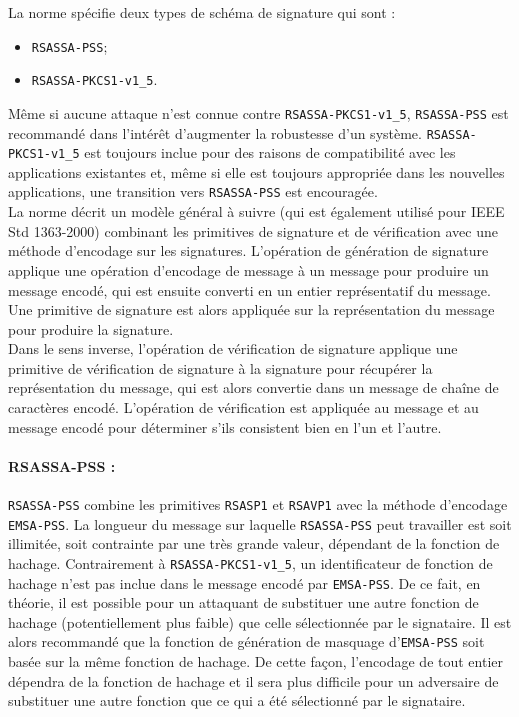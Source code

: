 La norme spécifie deux types de schéma de signature qui sont :
\begin{itemize}
\item \texttt{RSASSA-PSS};
\item \texttt{RSASSA-PKCS1-v1\_5}. \\
\end{itemize}

Même si aucune attaque n'est connue contre \texttt{RSASSA-PKCS1-v1\_5}, \texttt{RSASSA-PSS} est recommandé dans l'intérêt d'augmenter la robustesse d'un système. \texttt{RSASSA-PKCS1-v1\_5} est toujours inclue pour des raisons de compatibilité avec les applications existantes et, même si elle est toujours appropriée dans les nouvelles applications, une transition vers \texttt{RSASSA-PSS} est encouragée.\\ 


La norme décrit un modèle général à suivre (qui est également utilisé pour IEEE Std 1363-2000) combinant les primitives de signature et de vérification avec une méthode d'encodage sur les signatures. L'opération de génération de signature applique une opération d'encodage de message à un message pour produire un message encodé, qui est ensuite converti en un entier représentatif du message. Une primitive de signature est alors appliquée sur la représentation du message pour produire la signature.\\ 


Dans le sens inverse, l'opération de vérification de signature applique une primitive de vérification de signature à la signature pour récupérer la représentation du message, qui est alors convertie dans un message de chaîne de caractères encodé. L'opération de vérification est appliquée au message et au message encodé pour déterminer s'ils  consistent bien en l'un et l'autre.\\ 


\paragraph{RSASSA-PSS : \\}
\texttt{RSASSA-PSS} combine les primitives \texttt{RSASP1} et \texttt{RSAVP1} avec la méthode d'encodage \texttt{EMSA-PSS}. La longueur du message sur laquelle \texttt{RSASSA-PSS} peut travailler est soit illimitée, soit contrainte par une très grande valeur, dépendant de la fonction de hachage. Contrairement à \texttt{RSASSA-PKCS1-v1\_5}, un identificateur de fonction de hachage n'est pas inclue dans le message encodé par \texttt{EMSA-PSS}. De ce fait, en théorie, il est possible pour un attaquant de substituer une autre fonction de hachage (potentiellement plus faible) que celle sélectionnée par le signataire. Il est alors recommandé que la fonction de génération de masquage d'\texttt{EMSA-PSS} soit basée sur la même fonction de hachage. De cette façon, l'encodage de tout entier dépendra de la fonction de hachage et il sera plus difficile pour un adversaire de substituer une autre fonction que ce qui a été sélectionné par le signataire.\\


